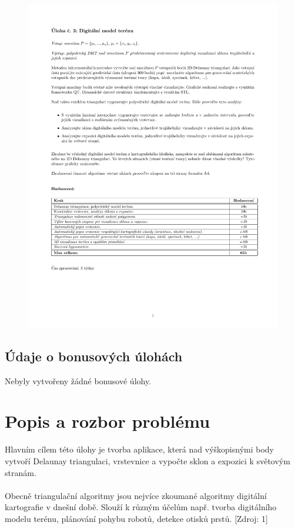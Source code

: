 \documentclass[a4paper, 12pt]{article}
\begin{document}
\begin{figure}[h!]
	\centering
	\includegraphics[clip, trim=0cm 5cm 0cm 0cm, width=1.2\textwidth]{zadani.pdf}
\end{figure}

\subsection{Údaje o bonusových úlohách}
Nebyly vytvořeny žádné bonusové úlohy.


\clearpage

\section{Popis a rozbor problému}
Hlavním cílem této úlohy je tvorba aplikace, která nad výškopisnými body vytvoří Delaunay triangulaci, vrstevnice a vypočte sklon a expozici k světovým stranám.\\
\\
Obecně triangulační algoritmy jsou nejvíce zkoumané algoritmy digitální kartografie v dnešní době. Slouží k různým účelům např. tvorba digitálního modelu terénu, plánování pohybu robotů, detekce otisků prstů.  [Zdroj: 1]
\\
\end{document}
